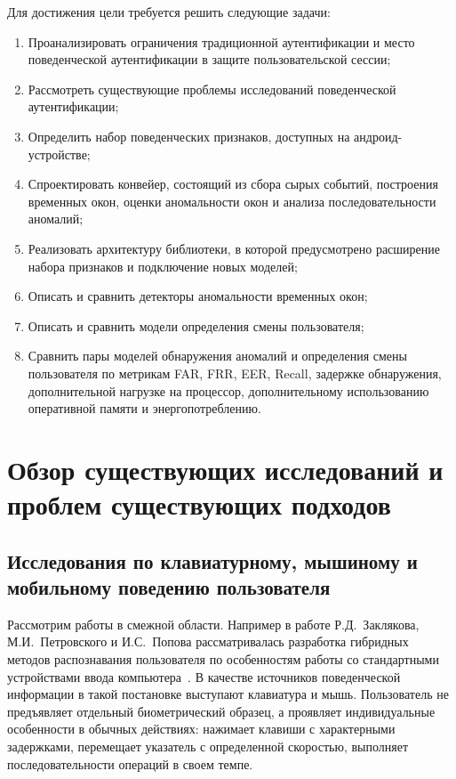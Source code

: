 \documentclass[oneside,senior,etd]{BYUPhys}
\begin{document}
Для достижения цели требуется решить следующие задачи:
\begin{enumerate}
    \item Проанализировать ограничения традиционной аутентификации и место поведенческой аутентификации в защите пользовательской сессии;
    \item Рассмотреть существующие проблемы исследований поведенческой аутентификации;
    \item Определить набор поведенческих признаков, доступных на андроид-устройстве;
    \item Спроектировать конвейер, состоящий из сбора сырых событий, построения временных окон, оценки аномальности окон и анализа последовательности аномалий;
    \item Реализовать архитектуру библиотеки, в которой предусмотрено расширение набора признаков и подключение новых моделей;
    \item Описать и сравнить детекторы аномальности временных окон;
    \item Описать и сравнить модели определения смены пользователя;
    \item Сравнить пары моделей обнаружения аномалий и определения смены пользователя по метрикам FAR, FRR, EER, Recall, задержке обнаружения, дополнительной нагрузке на процессор, дополнительному использованию оперативной памяти и энергопотреблению.
\end{enumerate}


\section{Обзор существующих исследований и проблем существующих подходов}

\subsection{Исследования по клавиатурному, мышиному и мобильному поведению пользователя}
Рассмотрим работы в смежной области. Например в работе Р.Д.~Заклякова, М.И.~Петровского и И.С.~Попова рассматривалась разработка гибридных методов распознавания пользователя по особенностям работы со стандартными устройствами ввода компьютера~\cite{zaklyakov2017hybrid}. В качестве источников поведенческой информации в такой постановке выступают клавиатура и мышь. Пользователь не предъявляет отдельный биометрический образец, а проявляет индивидуальные особенности в обычных действиях: нажимает клавиши с характерными задержками, перемещает указатель с определенной скоростью, выполняет последовательности операций в своем темпе.
\end{document}
